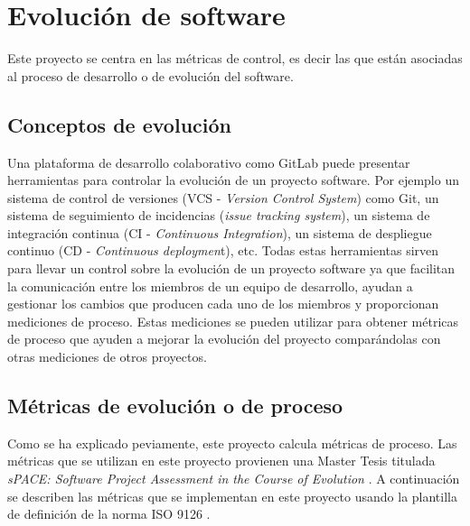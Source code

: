 \section{Evolución de software}
Este proyecto se centra en las métricas de control, es decir las que están asociadas al proceso de desarrollo o de evolución del software.
\subsection{Conceptos de evolución}
Una plataforma de desarrollo colaborativo como GitLab puede presentar herramientas para controlar la evolución de un proyecto software. Por ejemplo un sistema de control de versiones (VCS - \textit{Version Control System}) como Git, un sistema de seguimiento de incidencias (\textit{issue tracking system}), un sistema de integración continua (CI - \textit{Continuous Integration}), un sistema de despliegue continuo (CD - \textit{Continuous deploymen}t), etc.
Todas estas herramientas sirven para llevar un control sobre la evolución de un proyecto software ya que facilitan la comunicación entre los miembros de un equipo de desarrollo, ayudan a gestionar los cambios que producen cada uno de los miembros y proporcionan mediciones de proceso. Estas mediciones se pueden utilizar para obtener métricas de proceso que ayuden a mejorar la evolución del proyecto comparándolas con otras mediciones de otros proyectos.

\subsection{Métricas de evolución o de proceso}
Como se ha explicado peviamente, este proyecto calcula  métricas de proceso. Las métricas que se utilizan en este proyecto provienen una Master Tesis titulada \textit{sPACE: Software Project Assessment in the Course of Evolution} \cite{ratzinger_space:_2007}. 
A continuación se describen las métricas que se implementan en este proyecto usando la plantilla de definición de la norma ISO 9126 \cite{ISO9126}.\\

 
